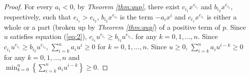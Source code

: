 \begin{proof}

	For every $ a_i<0$, by {\em Theorem \ref{thm:qup}}, there exist  $c_{i_1}x^{e_{i_1}}$ and $b_{i_2}x^{e_{i_2}},$  respectively, such that
	$e_{i_1}>e_{i_2}$, $b_{i_2}x^{e_{i_2} }$ is the term $-a_ix^i$
	and $c_{i_1}x^{e_{i_1} }$ is either a whole or a part (broken up by {\em Theorem \ref{thm:qup}}) of a positive term of $p$. Since $u$ satisfies equation (\ref{eq:2}),
	 $c_{i_1}u^{e_{i_1}}\ge b_{i_2}u^{e_{i_2}}$.  
for any $k= 0,1,\ldots,n$.  Since  $c_{i_1}u^{e_{i_1}}\ge b_{i_2}u^{e_{i_2}}$, $\sum_{i=k}^na_iu^i\ge 0$ for 
	 $k= 0,1,\ldots,n$. Since $u\ge0$,  $\sum_{i=k}^n a_i u^{i-k}\ge0 $ for any  $k= 0,1,\ldots,n$ and \\ 
	$\min_{k=0}^{n}\left\{  \sum_{i=k}^n a_i u^{i-k}\right\}\ge0$.
\end{proof}



%	
%

